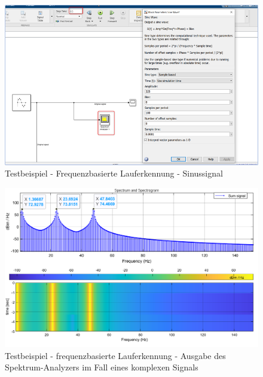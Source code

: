 \begin{figure}[H] %
	\centering
	\includegraphics[width=\linewidth]{Bilder/Lauferkennung_Freqbasiert_TestBeispiel_SinussignalGenerator.png}
	\caption{Testbeispiel - Frequenzbasierte Lauferkennung - Sinussignal}
	\label{fig:Lauferkennung_Freqbasiert_TestBeispiel_SinussignalGenerator}
\end{figure}


\begin{figure}[H]
	\centering
	\includegraphics[width=\linewidth]{Bilder/frequenzbasierte_Lauferkennung_SpectrumAnalyzer_Ausgabe2.png}
	\caption{Testbeispiel - frequenzbasierte Lauferkennung - Ausgabe des Spektrum-Analyzers im Fall eines komplexen Signals}
	\label{fig:Lauferkennung_Freqbasiert_SpektrumAnalyzerAusgabe_gezoomt}
\end{figure}

